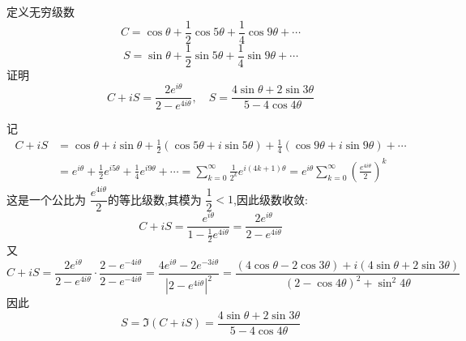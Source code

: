 \begin{questions}
    \question 定义无穷级数
        \[
        C=\cos\theta+\frac{1}{2}\cos5\theta+\frac{1}{4}\cos9\theta+\cdots
        \]
        \[
        S=\sin\theta+\frac{1}{2}\sin5\theta+\frac{1}{4}\sin9\theta+\cdots
        \]
        证明
        \[
        C+iS = \frac{2e^{i\theta}}{2 - e^{4i\theta}}, \quad 
        S = \frac{4\sin\theta + 2\sin3\theta}{5 - 4\cos4\theta}
        \]
    \begin{solution}
        记
        \begin{align*}
        C+iS &= \cos\theta + i\sin\theta + \frac{1}{2}(\cos5\theta + i\sin5\theta) + \frac{1}{4}(\cos9\theta + i\sin9\theta) + \cdots\\
        &= e^{i\theta} + \frac{1}{2}e^{i5\theta} + \frac{1}{4}e^{i9\theta} + \cdots
        = \sum_{k=0}^{\infty} \frac{1}{2^k} e^{i(4k+1)\theta}
        = e^{i\theta} \sum_{k=0}^{\infty} \left(\frac{e^{4i\theta}}{2}\right)^k        \end{align*}
        这是一个公比为 \(\dfrac{e^{4i\theta}}{2}\)的等比级数,其模为 \(\dfrac{1}{2}<1\),因此级数收敛:
        \[
        C+iS = \frac{e^{i\theta}}{1 - \frac{1}{2}e^{4i\theta}} = \frac{2e^{i\theta}}{2 - e^{4i\theta}}
        \]
        又
        \[
        C+iS =\frac{2e^{i\theta}}{2 - e^{4i\theta}} \cdot \frac{2 - e^{-4i\theta}}{2 - e^{-4i\theta}} = \frac{4e^{i\theta} - 2e^{-3i\theta}}{|2 - e^{4i\theta}|^2}=\frac{(4\cos\theta - 2\cos3\theta) + i(4\sin\theta + 2\sin3\theta)}{(2 - \cos4\theta)^2 + \sin^2 4\theta}
        \]
        因此
        \[
        S = \Im(C + iS) = \frac{4\sin\theta + 2\sin3\theta}{5 - 4\cos4\theta}
        \]
    \end{solution}


\end{questions}
